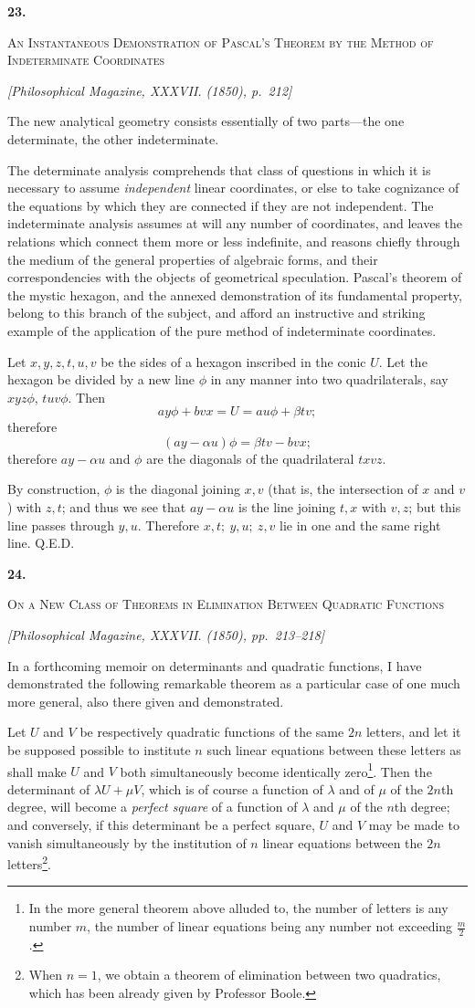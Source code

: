 \documentclass[11pt]{article}
\newcommand{\paperhead}[3]{%
  \clearpage
  \begin{center}
  {\Large\bfseries #1.}\par\vspace{0.85em}
  {\large\scshape #2}\par\vspace{0.6em}
  {\itshape [#3]}\par
  \end{center}\vspace{0.4em}}
\newcommand{\sourcepage}[1]{\marginpar{\scriptsize p.~#1}}
\begin{document}
\paperhead{23}{An Instantaneous Demonstration of Pascal's Theorem by the Method of Indeterminate Coordinates}{Philosophical Magazine, XXXVII. (1850), p.~212}

\sourcepage{138}
The new analytical geometry consists essentially of two parts---the one determinate, the other indeterminate.

The determinate analysis comprehends that class of questions in which it is necessary to assume \emph{independent} linear coordinates, or else to take cognizance of the equations by which they are connected if they are not independent. The indeterminate analysis assumes at will any number of coordinates, and leaves the relations which connect them more or less indefinite, and reasons chiefly through the medium of the general properties of algebraic forms, and their correspondencies with the objects of geometrical speculation. Pascal's theorem of the mystic hexagon, and the annexed demonstration of its fundamental property, belong to this branch of the subject, and afford an instructive and striking example of the application of the pure method of indeterminate coordinates.

Let $x,y,z,t,u,v$ be the sides of a hexagon inscribed in the conic $U$. Let the hexagon be divided by a new line $\phi$ in any manner into two quadrilaterals, say $xyz\phi$, $tuv\phi$. Then
\[
ay\phi+bvx=U=a u\phi+\beta t v;
\]
therefore
\[
(ay-\alpha u)\phi=\beta t v-bvx;
\]
therefore $ay-\alpha u$ and $\phi$ are the diagonals of the quadrilateral $txvz$.

By construction, $\phi$ is the diagonal joining $x,v$ (that is, the intersection of $x$ and $v$) with $z,t$; and thus we see that $ay-\alpha u$ is the line joining $t,x$ with $v,z$; but this line passes through $y,u$. Therefore $x,t;\ y,u;\ z,v$ lie in one and the same right line. Q.E.D.

\paperhead{24}{On a New Class of Theorems in Elimination Between Quadratic Functions}{Philosophical Magazine, XXXVII. (1850), pp.~213--218}

\sourcepage{139}
In a forthcoming memoir on determinants and quadratic functions, I have demonstrated the following remarkable theorem as a particular case of one much more general, also there given and demonstrated.

Let $U$ and $V$ be respectively quadratic functions of the same $2n$ letters, and let it be supposed possible to institute $n$ such linear equations between these letters as shall make $U$ and $V$ both simultaneously become identically zero\footnote{In the more general theorem above alluded to, the number of letters is any number $m$, the number of linear equations being any number not exceeding $\frac{m}{2}$.}. Then the determinant of $\lambda U+\mu V$, which is of course a function of $\lambda$ and of $\mu$ of the $2n$th degree, will become a \emph{perfect square} of a function of $\lambda$ and $\mu$ of the $n$th degree; and conversely, if this determinant be a perfect square, $U$ and $V$ may be made to vanish simultaneously by the institution of $n$ linear equations between the $2n$ letters\footnote{When $n=1$, we obtain a theorem of elimination between two quadratics, which has been already given by Professor Boole.}.
\end{document}
